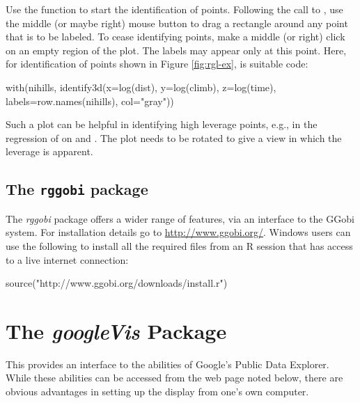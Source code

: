 Use the function  to start the identification of
points.  Following the call to , use the middle (or
maybe right) mouse button to drag a rectangle around any point that is
to be labeled.  To cease identifying points, make a middle (or right)
click on an empty region of the plot.  The labels may appear only at
this point.  Here, for identification of points shown in Figure
\ref{fig:rgl-ex}, is suitable code:
\begin{Schunk}
\begin{Sinput}
with(nihills, identify3d(x=log(dist), y=log(climb),
                         z=log(time),
                         labels=row.names(nihills),
                         col="gray"))
\end{Sinput}
\end{Schunk}

Such a plot can be helpful in identifying high leverage points,
e.g., in the regression of  on 
and .  The plot needs to be rotated to give a view
in which the leverage is apparent.

\subsection*{The  \texttt{rggobi} package}

The \textit{rggobi} package offers a wider range of features, via an
interface to the GGobi system.  For installation details go to
\url{http://www.ggobi.org/}.  Windows users can use the following to
install all the required files from an R session that has access to a
live internet connection:
\begin{Schunk}
\begin{Sinput}
source("http://www.ggobi.org/downloads/install.r")
\end{Sinput}
\end{Schunk}

\section{The {\em googleVis} Package}\label{sec:gvis}

This provides an interface to the abilities of Google's Public Data
Explorer.  While these abilities can be accessed from the web page
noted below, there are obvious advantages in setting up the display
from one's own computer.

